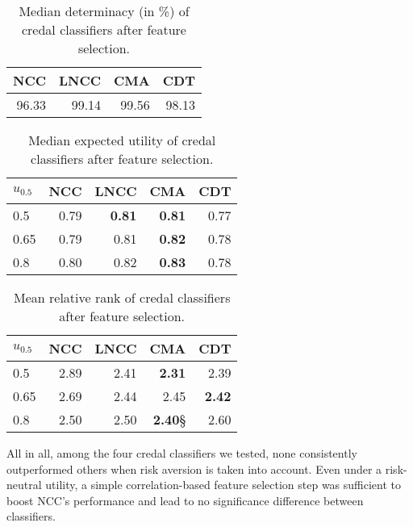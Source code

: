 \documentclass[a4paper,10pt,reqno]{amsart}
\theoremstyle{remark}
\begin{document}
\begin{table}[htp]
  \centering
  \begin{tabular}{rrrr}
    \toprule
      NCC & LNCC & CMA & CDT\\ \midrule
    96.33 & 99.14 & 99.56 & 98.13\\ \bottomrule
  \end{tabular}
  \caption{Median determinacy (in \%) of credal classifiers after feature selection.}
  \label{tab:determinacies-with-feat-sel}
\end{table}

\begin{table}[htp]
  \centering
  \begin{tabular}{lrrrr}
    \toprule
      $u_{0.5}$  &  NCC & LNCC & CMA & CDT\\ \midrule
    0.5 & 0.79 & \textbf{0.81} & \textbf{0.81} & 0.77\\
    0.65 & 0.79 & 0.81 & \textbf{0.82} & 0.78 \\
    0.8 & 0.80 & 0.82 & \textbf{0.83} & 0.78 \\ \bottomrule
  \end{tabular}
  \caption{Median expected utility of credal classifiers after feature selection.}
  \label{tab:medians-with-feat-sel}
\end{table}

\begin{table}[htp]
  \centering
  \begin{tabular}{lrrrr}
    \toprule
      $u_{0.5}$        &  NCC & LNCC & CMA & CDT\\ \midrule
    0.5 & 2.89 & 2.41 &\textbf{ 2.31 }& 2.39\\
    0.65 & 2.69 & 2.44 & 2.45 & \textbf{2.42} \\
    0.8 & 2.50 & 2.50 & \textbf{2.40}§ & 2.60 \\ \bottomrule
  \end{tabular}
  \caption{Mean relative rank of credal classifiers after feature selection.}
  \label{tab:ranks-with-featsel}
\end{table}

All in all, among the four credal classifiers we tested, none consistently outperformed others when risk aversion is taken into account.
Even under a risk-neutral utility, a simple correlation-based feature selection step was sufficient to boost NCC's performance and lead to no significance difference between classifiers.

\end{document}
